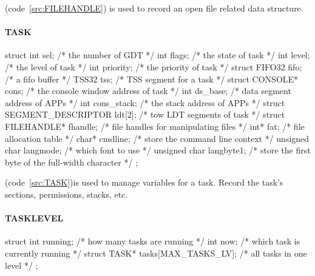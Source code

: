 \documentclass{swfcthesis}
\begin{document}
(code~\ref{src:FILEHANDLE}) is used to record an open file related data structure.



\paragraph{TASK}

\begin{listing}[H]
  \begin{codeblock}
\begin{ccode}
struct 
{ 
  int sel;                          /* the number of GDT */
  int flags;                        /* the state of task */
  int level;                        /* the level of task */
  int priority;                     /* the priority of task */
  struct FIFO32 fifo;               /* a fifo buffer */
  TSS32 tss;                        /* TSS segment for a task */
  struct CONSOLE* cons;             /* the console window address of task */
  int ds_base;                      /* data segment address of APPs */
  int cons_stack;                   /* the stack address of APPs */
  struct SEGMENT_DESCRIPTOR ldt[2]; /* tow LDT segments of task */
  struct FILEHANDLE* fhandle;       /* file handles for manipulating files */
  int* fat;                         /* file allocation table */
  char* cmdline;                    /* store the command line context */
  unsigned char langmode;           /* which font to use */
  unsigned char langbyte1;          /* store the first byte of the full-width character */
};
\end{ccode}
  \end{codeblock}
  \caption{\texttt{struct TASK}}\label{src:TASK}
\end{listing}

(code~\ref{src:TASK})is used to manage variables for a task. Record the task's sections,
permissions, stacks, etc.


\paragraph{TASKLEVEL}

\begin{listing}[H]
  \begin{codeblock}
\begin{ccode}
struct 
{ 
  int running;                      /* how many tasks are running */
  int now;                          /* which task is currently running */
  struct TASK* tasks[MAX_TASKS_LV]; /* all tasks in one level */
};
\end{ccode}
  \end{codeblock}
  \caption{\texttt{struct TASKLEVEL}}\label{src:TASKLEV}
\end{listing}
\end{document}
